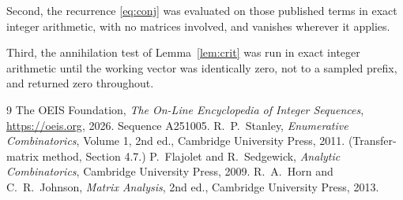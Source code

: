 \documentclass[11pt,a4paper]{article}
\theoremstyle{plain}
\theoremstyle{definition}
\begin{document}
Second, the recurrence \eqref{eq:conj} was evaluated on those published terms in exact
integer arithmetic, with no matrices involved, and vanishes wherever it applies.

Third, the annihilation test of Lemma~\ref{lem:crit} was run in exact integer arithmetic
until the working vector was identically zero, not to a sampled prefix, and returned zero
throughout.

\begin{thebibliography}{9}
 The OEIS Foundation, \emph{The On-Line Encyclopedia of Integer
Sequences}, \url{https://oeis.org}, 2026. Sequence A251005.
 R.~P.~Stanley, \emph{Enumerative Combinatorics}, Volume 1, 2nd ed.,
Cambridge University Press, 2011. (Transfer-matrix method, Section 4.7.)
 P.~Flajolet and R.~Sedgewick, \emph{Analytic Combinatorics}, Cambridge
University Press, 2009.
 R.~A.~Horn and C.~R.~Johnson, \emph{Matrix Analysis}, 2nd ed., Cambridge
University Press, 2013.
\end{thebibliography}
\end{document}
